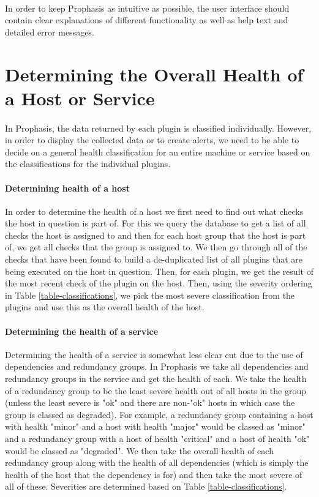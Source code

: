 \documentclass[bsc,logo,twoside,singlespacing,notimes]{infthesis}
\begin{document}
\paragraph*{}
	In order to keep Prophasis as intuitive as possible, the user interface should
	contain clear explanations of different functionality as well as help text and
	detailed error messages.
	
\section{Determining the Overall Health of a Host or Service}
\paragraph*{}
	In Prophasis, the data returned by each plugin is classified individually.
	However, in order to display the collected data or to create alerts, we need to
	be able to decide on a general health classification for an entire machine or
	service based on the classifications for the individual plugins.
	
\paragraph*{Determining health of a host}
	In order to determine the health of a host we first need to find out what
	checks the host in question is part of. For this we query the database to get
	a list of all checks the host is assigned to and then for each host group that
	the host is part of, we get all checks that the group is assigned to.  We then
	go through all of the checks that have been found to build a de-duplicated list
	of all plugins that are being executed on the host in question. Then, for each
	plugin, we get the result of the most recent check of the plugin on the host.
	Then, using the severity ordering in Table \ref{table-classifications}, we pick
	the most severe classification from the plugins and use this as the overall
	health of the host.
	
\paragraph*{Determining the health of a service}
	Determining the health of a service is somewhat less clear cut due to the use
	of dependencies and redundancy groups.  In Prophasis we take all dependencies
	and redundancy groups in the service and get the health of each.  We take the
	health of a redundancy group to be the least severe health out of all hosts in
	the group (unless the least severe is "ok" and there are non-"ok" hosts in
	which case the group is classed as degraded).  For example, a redundancy group
	containing a host with health "minor" and a host with health "major" would be
	classed as "minor" and a redundancy group with a host of health "critical" and
	a host of health "ok" would be classed as "degraded".  We then take the overall
	health of each redundancy group along with the health of all dependencies
	(which is simply the health of the host that the dependency is for) and then
	take the most severe of all of these.  Severities are determined based on Table
	\ref{table-classifications}.
\end{document}
